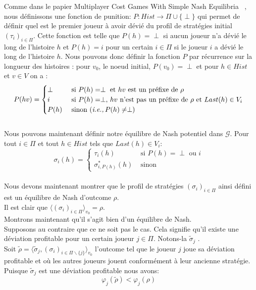 \begin{demonstration}
\begin{itemize}
	Comme dans le papier \og Multiplayer Cost Games With Simple Nash Equilibria \fg~\cite{DBLP:conf/lfcs/BrihayePS13}, nous définissons une fonction de punition: $P : Hist \rightarrow \Pi\cup \{ \perp \}$ qui permet de définir quel est le premier joueur à avoir dévié du profil de stratégies initial $(\tau_i)_{i\in\Pi}$. Cette fonction est telle que $P(h) = \perp$ si aucun joueur n'a dévié le long de l'histoire $h$ et $P(h) = i$ pour un certain $i \in \Pi$ si le joueur $i$ a dévié le long de l'histoire $h$. Nous pouvons donc définir la fonction $P$ par récurrence sur la longueur des histoires : pour $v_0$, le noeud initial, $P(v_0) = \perp$  et pour $h \in Hist$ et $v\in V$ on a :
	$$
	P(hv) = \begin{cases}
			\perp & \text{ si } P(h) = \perp \text{ et } hv \text{ est un préfixe de } \rho \\
			i & \text{ si } P(h) = \perp ,\, hv \text{ n'est pas un préfixe de }\rho \text{ et } Last(h)\in V_i\\
			P(h) & \text{ sinon (\emph{i.e.,}}\, P(h)\neq \perp) \end{cases}
	$$\\
	
	Nous pouvons maintenant définir notre équilibre de Nash potentiel dans $\mathcal{G}$. Pour tout $i\in \Pi$ et tout $h\in Hist$ tels que $Last(h)\in V_i$:
	$$\sigma_i(h)= \begin{cases}
					\tau_i(h) & \text{ si }P(h)= \perp \text{ ou }i \\
					\sigma^*_{i,P(h)}(h) & \text{ sinon }\end{cases}$$\\
					
	Nous devons maintenant montrer que le profil de stratégies $(\sigma_i)_{i\in\Pi}$ ainsi défini est un équilibre de Nash d'outcome $\rho$.\\
	Il est clair que $\langle (\sigma_i)_{i\in\Pi} \rangle_{v_0} = \rho$.\\
	Montrons maintenant qu'il s'agit bien d'un équilibre de Nash.\\
	\noindent Supposons au contraire que ce ne soit pas le cas. Cela signifie qu'il existe une déviation profitable pour un certain joueur $j \in\Pi$. Notons-la $\tilde{\sigma}_j$ .\\
		\noindent Soit $\tilde{\rho} = \langle \tilde{\sigma}_j , (\sigma_i)_{i \in \Pi \backslash \{j \}} \rangle_{v_0}$ l'outcome tel que le joueur $j$ joue sa déviation profitable et où les autres joueurs jouent conformément à leur ancienne stratégie.
		Puisque $\tilde{\sigma}_j$ est une déviation profitable nous avons: 
		\begin{equation}
			\label{eq:questEq4}
			\varphi_j(\tilde{\rho}) < \varphi_j(\rho)
		\end{equation}
		

\end{itemize}
\end{demonstration}
